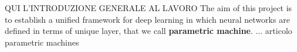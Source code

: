 QUI L'INTRODUZIONE GENERALE AL LAVORO
The aim of this project is to establish a unified framework for deep learning in which neural networks are defined in terms of unique layer, that we call \textbf{parametric machine}.
... articolo parametric machines